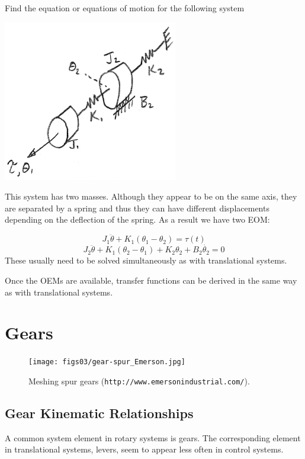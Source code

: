 \begin{ExampleSmall}
Find the equation or equations of motion for the following system 

\includegraphics[width=3.0in]{figs03/00743.png}

This system has two masses.  Although they appear to be on the same axis, they are separated by a spring and thus they can have different displacements depending on the deflection of the spring.  As a result we have two EOM:

\[
J_1\ddot{\theta} + K_1(\theta_1 - \theta_2) = \tau(t)
\]
\[
J_2\ddot{\theta} + K_1(\theta_2 - \theta_1) + K_2\theta_2 + B_2\dot{\theta_2} = 0
\]
These usually need to be solved simultaneously as with translational systems. 

\end{ExampleSmall}

Once the OEMs are available, transfer functions can be derived in the same way as with translational systems.

\section{Gears}

\begin{figure}[h]\centering
\texttt{[image: figs03/gear-spur\_Emerson.jpg]}
\caption{Meshing spur gears ({\tt http://www.emersonindustrial.com/}).}\label{2meshedgears}
\end{figure}

\subsection{Gear Kinematic Relationships}\label{gearkinematics}

A common system element in rotary systems is gears.  The corresponding element in translational systems, levers, seem to appear less often in control systems. 

